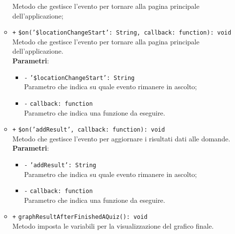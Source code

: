 \begin{itemize}
\begin{itemize}
		Metodo che gestisce l'evento per tornare alla pagina principale dell'applicazione;  
		\item \texttt{+} \texttt{\$on('\$locationChangeStart': String, callback: function): void} \\
		Metodo che gestisce l'evento per tornare alla pagina principale dell'applicazione.\\
		\textbf{Parametri}:
		\begin{itemize}
			  	\item \texttt{-} \texttt{'\$locationChangeStart': String} \\
			  	Parametro che indica su quale evento rimanere in ascolto;
			  	\item \texttt{-} \texttt{callback: function} \\
			  	Parametro che indica una funzione da eseguire.
		\end{itemize}
		\item \texttt{+} \texttt{\$on('addResult', callback: function): void} \\
		Metodo che gestisce l'evento per aggiornare i risultati dati alle domande. \\
		\textbf{Parametri}:
		\begin{itemize}
			\item \texttt{-} \texttt{'addResult': String} \\
			Parametro che indica su quale evento rimanere in ascolto;
			\item \texttt{-} \texttt{callback: function} \\
			Parametro che indica una funzione da eseguire.
		\end{itemize}
		\item \texttt{+} \texttt{graphResultAfterFinishedAQuiz(): void} \\
		Metodo imposta le variabili per la visualizzazione del grafico finale. 
	\end{itemize}
\end{itemize}

